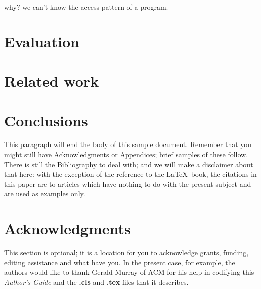 \documentclass{vldb}
\begin{document}
why? we can’t know the access pattern of a program.

\section{Evaluation}

\section{Related work}



\section{Conclusions}
This paragraph will end the body of this sample document.
Remember that you might still have Acknowledgments or
Appendices; brief samples of these
follow.  There is still the Bibliography to deal with; and
we will make a disclaimer about that here: with the exception
of the reference to the \LaTeX\ book, the citations in
this paper are to articles which have nothing to
do with the present subject and are used as
examples only.

\balance

\section{Acknowledgments}
This section is optional; it is a location for you
to acknowledge grants, funding, editing assistance and
what have you.  In the present case, for example, the
authors would like to thank Gerald Murray of ACM for
his help in codifying this \textit{Author's Guide}
and the \textbf{.cls} and \textbf{.tex} files that it describes.




\end{document}
